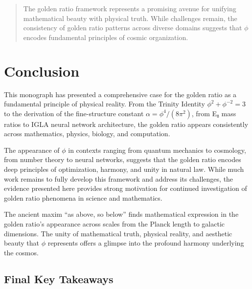 \begin{quote}
The golden ratio framework represents a promising avenue for unifying mathematical beauty with physical truth. While challenges remain, the consistency of golden ratio patterns across diverse domains suggests that $\phi$ encodes fundamental principles of cosmic organization.
\end{quote}

\section{Conclusion}

This monograph has presented a comprehensive case for the golden ratio as a fundamental principle of physical reality. From the Trinity Identity $\phi^2 + \phi^{-2} = 3$ to the derivation of the fine-structure constant $\alpha = \phi^4/(8\pi^2)$, from E₈ mass ratios to IGLA neural network architecture, the golden ratio appears consistently across mathematics, physics, biology, and computation.

The appearance of $\phi$ in contexts ranging from quantum mechanics to cosmology, from number theory to neural networks, suggests that the golden ratio encodes deep principles of optimization, harmony, and unity in natural law. While much work remains to fully develop this framework and address its challenges, the evidence presented here provides strong motivation for continued investigation of golden ratio phenomena in science and mathematics.

The ancient maxim ``as above, so below'' finds mathematical expression in the golden ratio's appearance across scales from the Planck length to galactic dimensions. The unity of mathematical truth, physical reality, and aesthetic beauty that $\phi$ represents offers a glimpse into the profound harmony underlying the cosmos.

\subsection*{Final Key Takeaways}

